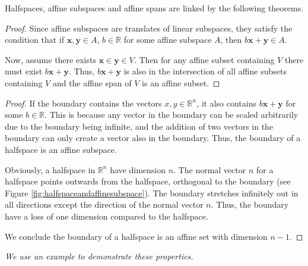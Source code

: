 		\bigskip		
		
		Halfspaces, affine subspaces and affine spans are linked by the following theorems.
		
		\begin{proof}
			Since affine subspaces are translates of linear subspaces, they satisfy the condition that if 
			$\textbf{x}, \textbf{y} \in A$, $b \in \mathbb{R}$ for some affine subspace $A$, 
			then $b \textbf{x} + \textbf{y} \in A$.
			
			Now, assume there exists $\textbf{x} \in \textbf{y} \in V$. 
			Then for any affine subset containing $V$ there must exist $b \textbf{x} + \textbf{y}$. 
			Thus, $b \textbf{x} + \textbf{y}$ is also in the intersection of all affine subsets containing $V$ 
			and the affine span of $V$ is an affine subset.
		\end{proof}
		
		\begin{proof}
			If the boundary contains the vectors $x,y \in \mathbb{R}^n$, it also contains 
			$b \textbf{x} + \textbf{y}$ for some $b \in \mathbb{R}$. 
			This is because any vector in the boundary can be scaled arbitrarily due to the boundary 
			being infinite, and the addition of two vectors in the boundary can only create a vector 
			also in the boundary. Thus, the boundary of a halfspace is an affine subspace.
		
			Obviously, a halfspace in $\mathbb{R}^n$ have dimension $n$. 
			The normal vector $n$ for a halfspace points outwards from the halfspace, orthogonal 
			to the boundary (see Figure \ref{fig:halfspaceandaffinesubspace}).
			The boundary stretches infinitely out in all directions except the direction of the 
			normal vector $n$. 
			Thus, the boundary have a loss of one dimension compared to the halfspace. 
			
			
			We conclude the boundary of a halfspace is an affine set with dimension $n-1$.
		\end{proof}
		\raggedbottom
		
		\emph{We use an example to demonstrate these properties.}
		
		
